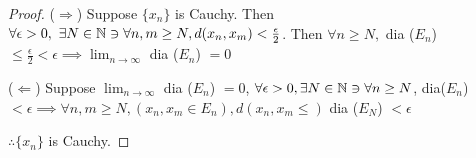 \begin{proof}
	($\Rightarrow$) Suppose $\{x_n\}$ is Cauchy. Then $\forall \epsilon > 0,~\exists N \in \mathbb{N} \ni \forall n,m \geq N, d(x_n,x_m) < \frac{\epsilon}{2}$. Then $\forall n \geq N,$ dia ($E_n$) $\leq \frac{\epsilon}{2} < \epsilon \implies \lim_{n \rightarrow \infty}$ dia ($E_n$) $= 0$
	
	($\Leftarrow$) Suppose $\lim_{n \rightarrow \infty}$ dia ($E_n$) $= 0$, $\forall \epsilon > 0 ,\exists N \in \mathbb{N} \ni \forall n \geq N$, dia($E_n$) $< \epsilon \implies \forall n,m \geq N, (x_n,x_m \in E_n), d(x_n,x_m \leq )$ dia ($E_N$) $< \epsilon$ 
	
	$\therefore \{x_n\}$ is Cauchy.
\end{proof}






















